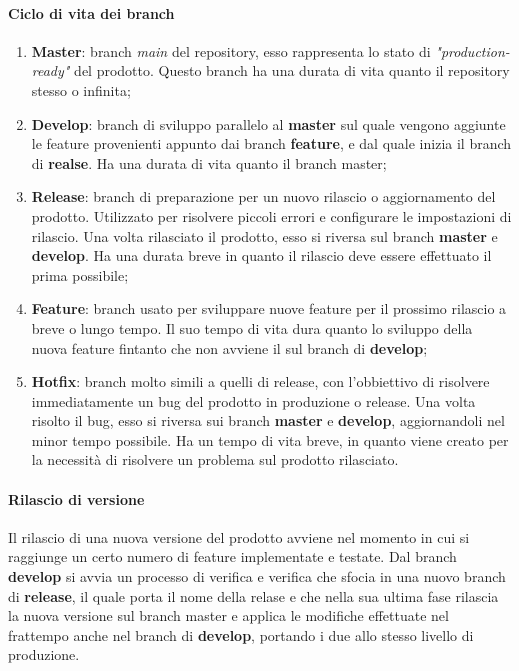 \paragraph{Ciclo di vita dei branch ~\\}
\begin{enumerate}
	
	\item \textbf{Master}: branch \textit{main} del repository, esso rappresenta lo stato di \textit{"production-ready"} del prodotto. Questo branch ha una durata di vita quanto il repository stesso o infinita;
	\item \textbf{Develop}: branch di sviluppo parallelo al \textbf{master} sul quale vengono aggiunte le feature provenienti appunto dai branch \textbf{feature},
	 e dal quale inizia il branch di \textbf{realse}. Ha una durata di vita quanto il branch master;
	 
	\item \textbf{Release}: branch di preparazione per un nuovo rilascio o aggiornamento del prodotto. 
	Utilizzato per risolvere piccoli errori e configurare le impostazioni di rilascio. Una volta rilasciato il 
	prodotto, esso si riversa sul branch \textbf{master} e \textbf{develop}. Ha una durata breve in quanto il rilascio deve essere effettuato il prima possibile;

	\item \textbf{Feature}: branch usato per sviluppare nuove feature per il prossimo rilascio a breve o lungo tempo. Il suo tempo di vita dura quanto lo sviluppo della nuova feature
	fintanto che non avviene il  sul branch di \textbf{develop};

	\item \textbf{Hotfix}: branch molto simili a quelli di release, con l'obbiettivo di risolvere immediatamente un bug del prodotto in produzione o release. Una volta risolto il bug, 
	esso si riversa sui branch \textbf{master} e \textbf{develop}, aggiornandoli nel minor tempo possibile. Ha un tempo di vita breve, in quanto viene creato per la necessità di risolvere 
	un problema sul prodotto rilasciato. 
	
\end{enumerate}

\paragraph{Rilascio di versione ~\\}
Il rilascio di una nuova versione del prodotto avviene nel momento in cui si raggiunge un certo numero di feature implementate e testate. 
Dal branch \textbf{develop} si avvia un processo di verifica e verifica che sfocia in una nuovo branch di \textbf{release}, il quale porta il nome della relase e che nella sua ultima fase 
rilascia la nuova versione sul branch master e applica le modifiche effettuate nel frattempo anche nel branch di \textbf{develop}, portando i due allo stesso livello di produzione. 

